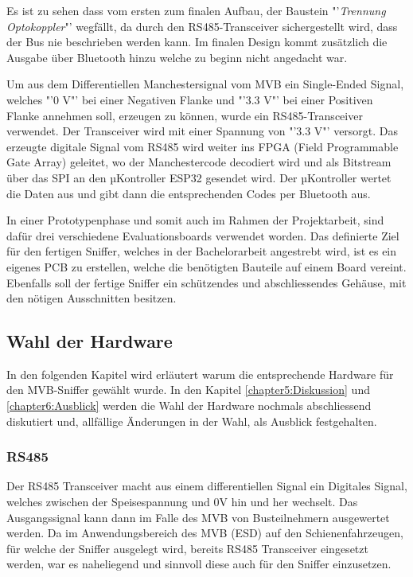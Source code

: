 Es ist zu sehen dass vom ersten zum finalen Aufbau, der Baustein "'\textit{Trennung Optokoppler}"'
wegfällt, da durch den RS485-Transceiver sichergestellt wird, dass der Bus nie beschrieben werden kann.
Im finalen Design kommt zusätzlich die Ausgabe über Bluetooth hinzu welche zu beginn nicht angedacht
war.

Um aus dem Differentiellen Manchestersignal vom MVB ein Single-Ended Signal, welches "'0 V"' bei einer 
Negativen Flanke und "'3.3 V"' bei einer Positiven Flanke annehmen soll, erzeugen zu können, wurde ein
RS485-Transceiver verwendet. Der Transceiver wird mit einer Spannung von "'3.3 V"' versorgt. Das
erzeugte digitale Signal vom RS485 wird weiter ins FPGA (Field Programmable Gate Array) geleitet, wo
der Manchestercode decodiert wird und als Bitstream über das SPI an den µKontroller ESP32 gesendet
wird. Der µKontroller wertet die Daten aus und gibt dann die entsprechenden Codes per Bluetooth aus.

In einer Prototypenphase und somit auch im Rahmen der Projektarbeit, sind dafür drei verschiedene
Evaluationsboards verwendet worden. Das definierte Ziel für den fertigen Sniffer, welches in der
Bachelorarbeit angestrebt wird, ist es ein eigenes PCB zu erstellen, welche die benötigten Bauteile auf
einem Board vereint. Ebenfalls soll der fertige Sniffer ein schützendes und abschliessendes Gehäuse,
mit den nötigen Ausschnitten besitzen.

\subsection{Wahl der Hardware}
In den folgenden Kapitel wird erläutert warum die entsprechende Hardware für den MVB-Sniffer gewählt
wurde. In den Kapitel \ref{chapter5:Diskussion} und \ref{chapter6:Ausblick} werden die Wahl der
Hardware nochmals abschliessend diskutiert und, allfällige Änderungen in der Wahl, als Ausblick 
festgehalten.


\subsubsection{RS485}
Der RS485 Transceiver macht aus einem differentiellen Signal ein Digitales Signal, welches zwischen der Speisespannung und 0V hin und her wechselt. Das Ausgangssignal kann dann im Falle des MVB von Busteilnehmern ausgewertet werden. Da im Anwendungsbereich des MVB (ESD) auf den Schienenfahrzeugen, für welche der Sniffer ausgelegt wird, bereits RS485 Transceiver eingesetzt werden, war es naheliegend und sinnvoll diese auch für den Sniffer einzusetzen.

